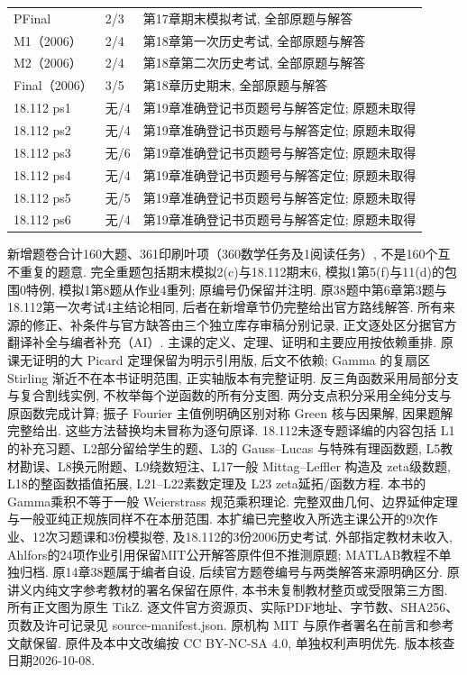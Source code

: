 \begin{longtable}{@{}p{}p{}p{}@{}}
PFinal&2/3&第17章期末模拟考试, 全部原题与解答\\
M1（2006）&2/4&第18章第一次历史考试, 全部原题与解答\\
M2（2006）&2/4&第18章第二次历史考试, 全部原题与解答\\
Final（2006）&3/5&第18章历史期末, 全部原题与解答\\
18.112 ps1&无/4&第19章准确登记书页题号与解答定位; 原题未取得\\
18.112 ps2&无/4&第19章准确登记书页题号与解答定位; 原题未取得\\
18.112 ps3&无/6&第19章准确登记书页题号与解答定位; 原题未取得\\
18.112 ps4&无/4&第19章准确登记书页题号与解答定位; 原题未取得\\
18.112 ps5&无/5&第19章准确登记书页题号与解答定位; 原题未取得\\
18.112 ps6&无/4&第19章准确登记书页题号与解答定位; 原题未取得\\
\bottomrule\end{longtable}
新增题卷合计160大题、361印刷叶项（360数学任务及1阅读任务）, 不是160个互不重复的题意. 完全重题包括期末模拟2(c)与18.112期末6, 模拟1第5(f)与11(d)的包围0特例, 模拟1第8题从作业4重列; 原编号仍保留并注明. 原38题中第6章第3题与18.112第一次考试4主结论相同, 后者在新增章节仍完整给出官方路线解答. 所有来源的修正、补条件与官方缺答由三个独立库存审稿分别记录, 正文逐处区分据官方翻译补全与编者补充（AI）.
主课的定义、定理、证明和主要应用按依赖重排. 原课无证明的大 Picard 定理保留为明示引用版, 后文不依赖; Gamma 的复扇区 Stirling 渐近不在本书证明范围, 正实轴版本有完整证明. 反三角函数采用局部分支与复合割线实例, 不枚举每个逆函数的所有分支图. 两分支点积分采用全纯分支与原函数完成计算; 振子 Fourier 主值例明确区别对称 Green 核与因果解, 因果题解完整给出. 这些方法替换均未冒称为逐句原译.
18.112未逐专题译编的内容包括 L1的补充习题、L2部分留给学生的题、L3的 Gauss--Lucas 与特殊有理函数题, L5教材勘误、L8换元附题、L9绕数短注、L17一般 Mittag--Leffler 构造及 zeta级数题, L18的整函数插值拓展, L21--L22素数定理及 L23 zeta延拓/函数方程. 本书的Gamma乘积不等于一般 Weierstrass 规范乘积理论. 完整双曲几何、边界延伸定理与一般亚纯正规族同样不在本册范围.
本扩编已完整收入所选主课公开的9次作业、12次习题课和3份模拟卷, 及18.112的3份2006历史考试. 外部指定教材未收入, Ahlfors的24项作业引用保留MIT公开解答原件但不推测原题; MATLAB教程不单独归档. 原14章38题属于编者自设, 后续官方题卷编号与两类解答来源明确区分. 原讲义内纯文字参考教材的署名保留在原件, 本书未复制教材整页或受限第三方图. 所有正文图为原生 TikZ.
逐文件官方资源页、实际PDF地址、字节数、SHA256、页数及许可记录见 source-manifest.json. 原机构 MIT 与原作者署名在前言和参考文献保留. 原件及本中文改编按 CC BY-NC-SA 4.0, 单独权利声明优先. 版本核查日期2026-10-08.
